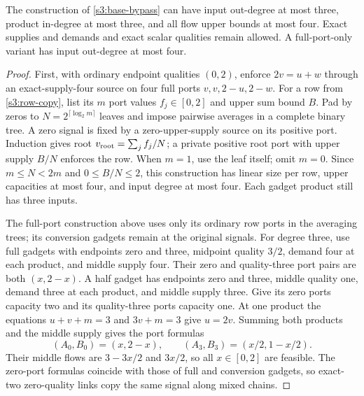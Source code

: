 \begin{lemma}\label{s3:half}
The construction of \cref{s3:base-bypass} can have input out-degree at
most three, product in-degree at most three, and all flow upper bounds at
most four. Exact supplies and demands and exact scalar qualities remain
allowed. A full-port-only variant has input out-degree at most four.
\end{lemma}
\begin{proof}
First, with ordinary endpoint qualities $(0,2)$, enforce
$2v=u+w$ through an exact-supply-four source on four full ports
$v,v,2-u,2-w$. For a row from \cref{s3:row-copy}, list its $m$ port
values $f_j\in[0,2]$ and upper sum bound $B$. Pad by zeros to
$N=2^{\lceil\log_2m\rceil}$ leaves and impose pairwise averages in a
complete binary tree. A zero signal is fixed by a zero-upper-supply
source on its positive port. Induction gives root
$v_{\rm root}=\sum_jf_j/N$; a private positive root port with upper
supply $B/N$ enforces the row. When $m=1$, use the leaf itself; omit
$m=0$. Since $m\le N<2m$ and $0\le B/N\le2$, this construction has
linear size per row, upper capacities at most four, and input degree
at most four. Each gadget product still has three inputs.

The full-port construction above uses only its ordinary row ports in
the averaging trees; its conversion gadgets remain at the original
signals. For degree three, use full gadgets with endpoints zero and three,
midpoint quality $3/2$, demand four at each product, and middle supply
four. Their zero and quality-three port pairs are both $(x,2-x)$.
A half gadget has endpoints zero and three, middle quality one,
demand three at each product, and middle supply three. Give its zero
ports capacity two and its quality-three ports capacity one. At one
product the equations $u+v+m=3$ and $3v+m=3$ give $u=2v$.
Summing both products and the middle supply gives the port formulas
\begin{equation}
 (A_0,B_0)=(x,2-x),\qquad
 (A_3,B_3)=(x/2,1-x/2).\label{s3:half-ports}
\end{equation}
Their middle flows are $3-3x/2$ and $3x/2$, so all $x\in[0,2]$
are feasible. The zero-port formulas coincide with those of full and
conversion gadgets, so exact-two zero-quality links copy the same
signal along mixed chains.


\end{proof}
